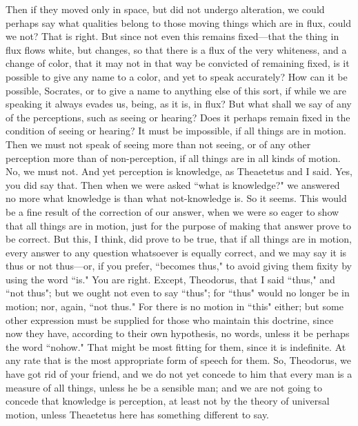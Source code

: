 \documentclass[letterpaper,12pt]{article}
\newcommand{\stephpag}[1]{\marginnote{\small\itshape\fontfamily{ppl}\selectfont #1}}
\begin{document}
\begin{drama}
\socratesspeaks
Then if they moved only in space, but did not undergo alteration, we could perhaps say what qualities belong to those moving things which are in flux, could we not?
\theodorusspeaks
That is right. \stephpag{d}
\socratesspeaks
But since not even this remains fixed—that the thing in flux flows white, but changes, so that there is a flux of the very whiteness, and a change of color, that it may not in that way be convicted of remaining fixed, is it possible to give any name to a color, and yet to speak accurately?
\theodorusspeaks
How can it be possible, Socrates, or to give a name to anything else of this sort, if while we are speaking it always evades us, being, as it is, in flux?
\socratesspeaks
But what shall we say of any of the perceptions, such as seeing or hearing? Does it perhaps remain fixed in the condition of \stephpag{e} seeing or hearing?
\theodorusspeaks
It must be impossible, if all things are in motion.
\socratesspeaks
Then we must not speak of seeing more than not seeing, or of any other perception more than of non-perception, if all things are in all kinds of motion.
\theodorusspeaks
No, we must not.
\socratesspeaks
And yet perception is knowledge, as Theaetetus and I said.
\theodorusspeaks
Yes, you did say that.
\socratesspeaks
Then when we were asked ``what is knowledge?" we answered no more what knowledge is than what not-knowledge is. \stephpag{183 a}
\theodorusspeaks
So it seems.
\socratesspeaks
This would be a fine result of the correction of our answer, when we were so eager to show that all things are in motion, just for the purpose of making that answer prove to be correct. But this, I think, did prove to be true, that if all things are in motion, every answer to any question whatsoever is equally correct, and we may say it is thus or not thus—or, if you prefer, ``becomes thus," to avoid giving them fixity by using the word ``is."
\theodorusspeaks
You are right.
\socratesspeaks
Except, Theodorus, that I said ``thus," and ``not thus"; but we ought not even to say ``thus"; \stephpag{b} for ``thus" would no longer be in motion; nor, again, ``not thus." For there is no motion in ``this" either; but some other expression must be supplied for those who maintain this doctrine, since now they have, according to their own hypothesis, no words, unless it be perhaps the word ``nohow." That might be most fitting for them, since it is indefinite.
\theodorusspeaks
At any rate that is the most appropriate form of speech for them.
\socratesspeaks
So, Theodorus, we have got rid of your friend, and we do not yet concede to him that every man is a measure of all things, unless he be a sensible man; \stephpag{c} and we are not going to concede that knowledge is perception, at least not by the theory of universal motion, unless Theaetetus here has something different to say.

\end{drama}
\end{document}
